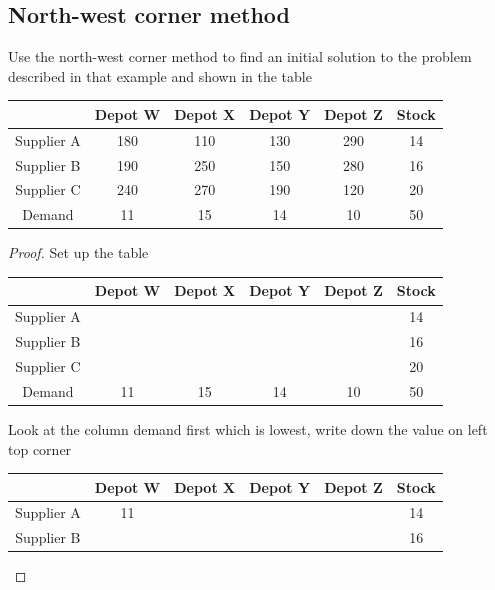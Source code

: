 \documentclass[a4paper]{article}
\begin{document}
\subsection{North-west corner method}
\begin{eg}
	Use the north-west corner method to find an initial solution to the problem described in that example and shown in the table
	\begin{center}
		\begin{tabular}{|c|c|c|c|c|c|}
			\hline
			           & Depot W & Depot X & Depot Y & Depot Z & Stock \\
			\hline
			Supplier A & 180     & 110     & 130     & 290     & 14    \\
			\hline
			Supplier B & 190     & 250     & 150     & 280     & 16    \\
			\hline
			Supplier C & 240     & 270     & 190     & 120     & 20    \\
			\hline
			Demand     & 11      & 15      & 14      & 10      & 50    \\
			\hline
		\end{tabular}
	\end{center}
	\begin{proof}
		Set up the table
		\begin{center}
			\begin{tabular}{|c|c|c|c|c|c|}
				\hline
				           & Depot W & Depot X & Depot Y & Depot Z & Stock \\
				\hline
				Supplier A &         &         &         &         & 14    \\
				\hline
				Supplier B &         &         &         &         & 16    \\
				\hline
				Supplier C &         &         &         &         & 20    \\
				\hline
				Demand     & 11      & 15      & 14      & 10      & 50    \\
				\hline
			\end{tabular}
		\end{center}
		Look at the column demand first which is lowest, write down the value on left top corner
		\begin{center}
			\begin{tabular}{|c|c|c|c|c|c|}
				\hline
				           & Depot W & Depot X & Depot Y & Depot Z & Stock \\
				\hline
				Supplier A & 11      &         &         &         & 14    \\
				\hline
				Supplier B &         &         &         &         & 16    \\

\end{tabular}
\end{center}
\end{proof}
\end{eg}
\end{document}
